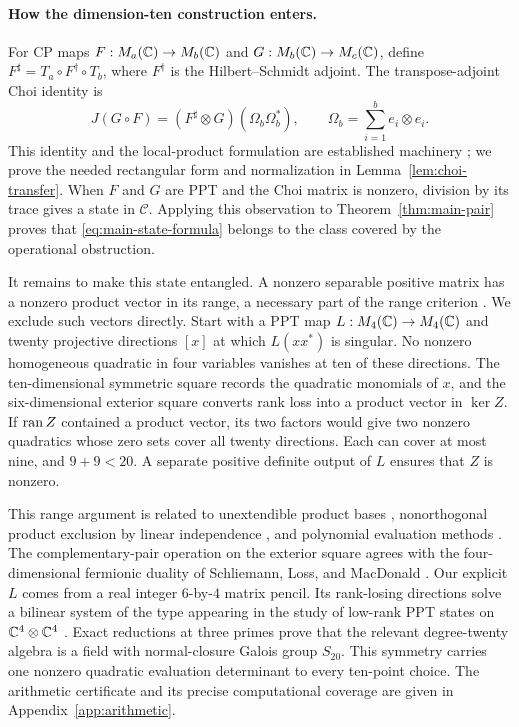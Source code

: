 \paragraph{How the dimension-ten construction enters.}
For CP maps $F:M_{a}(\mathbb C)\to M_{b}(\mathbb C)$ and $G:M_{b}(\mathbb C)\to M_{c}(\mathbb C)$, define
$F^\sharp=T_a\circ F^\dagger\circ T_b$, where $F^\dagger$ is the
Hilbert--Schmidt adjoint.  The transpose-adjoint Choi identity is
\[
 J(G\circ F)=(F^\sharp\otimes G)(\Omega_b\Omega_b^*),
 \qquad \Omega_b=\sum_{i=1}^b e_i\otimes e_i.
\]
This identity and the local-product formulation are established machinery
\cite[Lemma I.1(2), Section IV.B]{CMHW2019}; we prove the needed rectangular
form and normalization in Lemma~\ref{lem:choi-transfer}.  When $F$ and $G$
are PPT and the Choi matrix is nonzero, division by its trace gives a state
in $\mathscr C$.  Applying this observation to
Theorem~\ref{thm:main-pair} proves that \eqref{eq:main-state-formula} belongs
to the class covered by the operational obstruction.

It remains to make this state entangled.  A nonzero separable positive
matrix has a nonzero product vector in its range, a necessary part of the
range criterion \cite{Horodecki1997}.  We exclude such vectors directly.
Start with a PPT map $L:M_{4}(\mathbb C)\to M_{4}(\mathbb C)$ and twenty projective directions
$[x]$ at which $L(xx^*)$ is singular.  No nonzero homogeneous quadratic in
four variables vanishes at ten of these directions.  The ten-dimensional
symmetric square records the quadratic monomials of $x$, and the
six-dimensional exterior square converts rank loss into a product vector
in $\ker Z$.  If $\operatorname{ran} Z$ contained a product vector, its two factors would
give two nonzero quadratics whose zero sets cover all twenty directions.
Each can cover at most nine, and $9+9<20$.  A separate positive definite
output of $L$ ensures that $Z$ is nonzero.

This range argument is related to unextendible product bases
\cite{Bennett1999}, nonorthogonal product exclusion by linear independence
\cite[Section IV, Lemma 3]{Pittenger2003}, and polynomial evaluation methods
\cite[Proposition 1.3]{Parthasarathy2004}.  The complementary-pair operation
on the exterior square agrees with the four-dimensional fermionic duality
of Schliemann, Loss, and MacDonald
\cite[Section III]{SchliemannLossMacDonald2001}.  Our explicit $L$ comes from
a real integer $6$-by-$4$ matrix pencil.  Its rank-losing directions solve a
bilinear system of the type appearing in the study of low-rank PPT states
on $\mathbb C^4\otimes\mathbb C^4$ \cite[Section 7]{HansenEtAl2012}.  Exact reductions at
three primes prove that the relevant degree-twenty algebra is a field with
normal-closure Galois group $S_{20}$.  This symmetry carries one nonzero
quadratic evaluation determinant to every ten-point choice.  The arithmetic
certificate and its precise computational coverage are given in
Appendix~\ref{app:arithmetic}.

